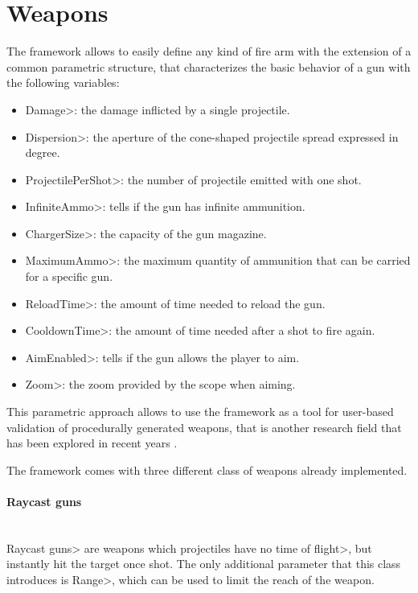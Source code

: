 
\section{Weapons}

The framework allows to easily define any kind of fire arm with the extension of a common parametric structure, that characterizes the basic behavior of a gun with the following variables: 

\begin{itemize}
\item \<Damage>: the damage inflicted by a single projectile.
\item \<Dispersion>: the aperture of the cone-shaped projectile spread expressed in degree.
\item \<ProjectilePerShot>: the number of projectile emitted with one shot.
\item \<InfiniteAmmo>: tells if the gun has infinite ammunition.
\item \<ChargerSize>: the capacity of the gun magazine.
\item \<MaximumAmmo>: the maximum quantity of ammunition that can be carried for a specific gun.
\item \<ReloadTime>: the amount of time needed to reload the gun.
\item \<CooldownTime>:  the amount of time needed after a shot to fire again.
\item \<AimEnabled>: tells if the gun allows the player to aim.
\item \<Zoom>: the zoom provided by the scope when aiming.
\end{itemize}

This parametric approach allows to use the framework as a tool for user-based validation of procedurally generated weapons, that is another research field that has been explored in recent years \cite{ArmiProcedurali}.

\par 

The framework comes with three different class of weapons already implemented.

\paragraph{Raycast guns}

\mbox{}\\

{\setlength{\parindent}{0cm}
\<Raycast guns> are weapons which projectiles have no \<time of flight>, but instantly hit the target once shot. The only additional parameter that this class introduces is \<Range>, which can be used to limit the reach of the weapon.
}

